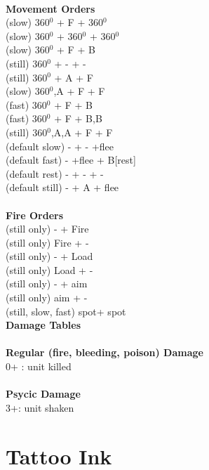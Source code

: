 \ \\ {\bf Movement Orders } \\
(slow) 360$^0$ + F + 360$^0$ \\
(slow) 360$^0$ + 360$^0$ + 360$^0$ \\
(slow) 360$^0$ + F + B \\
(still) 360$^0$ + - + - \\
(still) 360$^0$ + A + F \\
(slow) 360$^0$,A + F + F \\
(fast) 360$^0$ + F + B \\
(fast) 360$^0$ + F + B,B \\
(still) 360$^0$,A,A + F + F \\
(default slow) - + - +flee \\
(default fast) - +flee + B[rest] \\
(default rest) - + - + - \\
(default still) - + A + flee \\
\ \\ {\bf Fire Orders } \\
(still only) - + Fire \\
(still only) Fire + -  \\
(still only) - + Load \\
(still only) Load + - \\
(still only) - + aim \\
(still only) aim + -  \\
(still, slow, fast) spot+ spot \\



{\bf Damage Tables} \\
\ \\ {\bf Regular (fire, bleeding, poison) Damage } \\
0+ : unit killed \\
\ \\ {\bf Psycic Damage } \\
3+: unit shaken \\









\pagebreak

\section{ Tattoo Ink }

